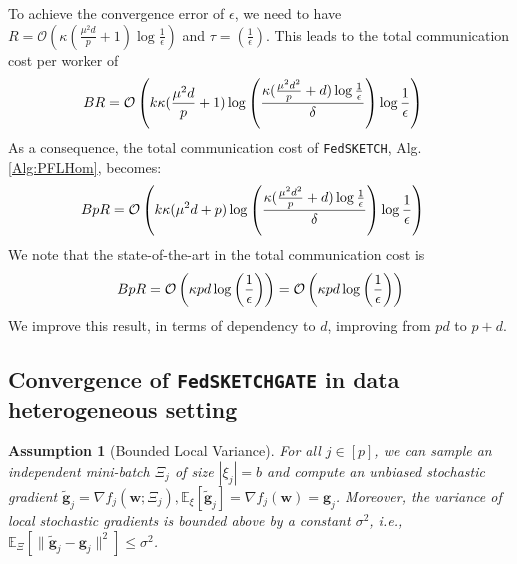 \documentclass[review,onefignum,onetabnum]{siamart190516}
\newtheorem{assumption}{Assumption}
\begin{document}
\begin{corollary}
To achieve the convergence error of $\epsilon$, we need to have $R=\mathcal{O}\left(\kappa(\frac{\mu^2d}{p}+1)\log\frac{1}{\epsilon}\right)$ and $\tau=\left(\frac{1}{\epsilon}\right)$. This leads to the total communication cost per worker of 
\begin{align}\notag
BR&=\mathcal{O}\left(k\kappa(\frac{\mu^2d}{p}+1)\log\left(\frac{\kappa(\frac{\mu^2d^2}{p}+d)\log\frac{1}{\epsilon}}{\delta}\right)\log\frac{1}{\epsilon} \right)
\end{align}
As a consequence, the total communication cost of \texttt{FedSKETCH}, Alg.\ref{Alg:PFLHom}, becomes:
\begin{align}\notag
BpR&=\mathcal{O}\left(k\kappa(\mu^2d+p)\log\left(\frac{\kappa(\frac{\mu^2d^2}{p}+d)\log\frac{1}{\epsilon}}{\delta}\right)\log\frac{1}{\epsilon} \right)
\end{align}
We note that the state-of-the-art in \cite{karimireddy2019scaffold} the total communication cost is 
\begin{align}\notag
    BpR=\mathcal{O}\left(\kappa pd\log\left(\frac{1}{\epsilon}\right) \right)=\mathcal{O}\left(\kappa pd\log\left(\frac{1}{\epsilon}\right)\right) 
\end{align}
We improve this result, in terms of dependency to $d$, improving from $pd$ to $p+d$.
\end{corollary}


\subsection{Convergence of  \texttt{FedSKETCHGATE} in data heterogeneous setting} 
\begin{assumption}[Bounded Local Variance]\label{Assu:2}
For all $j\in [p]$, we can sample an independent mini-batch $\Xi_j$   of size $|{\xi}_j| = b$ and compute an unbiased stochastic gradient $\tilde{\mathbf{g}}_j = \nabla f_j(\boldsymbol{w}; \Xi_j), \mathbb{E}_{\xi}[\tilde{\mathbf{g}}_j] = \nabla f_{j}(\boldsymbol{w})={\mathbf{g}}_j$. Moreover, the variance of local stochastic gradients is bounded above by a constant $\sigma^2$, i.e., $
\mathbb{E}_{\Xi}\left[\|\tilde{\mathbf{g}}_j-{\mathbf{g}}_j\|^2\right]\leq \sigma^2$.
\end{assumption}
\end{document}
